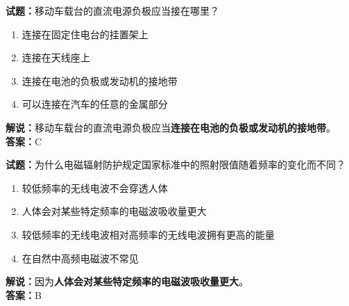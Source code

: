 \documentclass{ctexbook}
\begin{document}
\vspace{\baselineskip}

\noindent\textbf{试题：}移动车载台的直流电源负极应当接在哪里？
\begin{enumerate}[leftmargin=3em]
  \item 连接在固定住电台的挂置架上
  \item 连接在天线座上
  \item 连接在电池的负极或发动机的接地带
  \item 可以连接在汽车的任意的金属部分
\end{enumerate}
\noindent\textbf{解说：}移动车载台的直流电源负极应当\textbf{连接在电池的负极或发动机的接地带}。\\
\textbf{答案：}C

\vspace{\baselineskip}

\noindent\textbf{试题：}为什么电磁辐射防护规定国家标准中的照射限值随着频率的变化而不同？
\begin{enumerate}[leftmargin=3em]
  \item 较低频率的无线电波不会穿透人体
  \item 人体会对某些特定频率的电磁波吸收量更大
  \item 较低频率的无线电波相对高频率的无线电波拥有更高的能量
  \item 在自然中高频电磁波不常见
\end{enumerate}
\noindent\textbf{解说：}因为\textbf{人体会对某些特定频率的电磁波吸收量更大}。\\
\textbf{答案：}B






%


\end{document}

